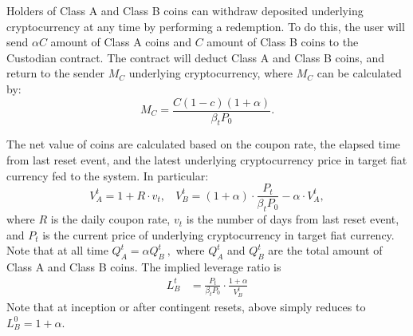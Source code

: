 \documentclass[draft, noinfoline]{ectaart}
\numberwithin{equation}{section}
\theoremstyle{plain}
\begin{document}
\begin{appendices}

Holders of Class A and Class B coins can withdraw deposited underlying cryptocurrency at any time by performing a redemption. To do this, the user will send $\alpha C$ amount of Class A coins and $C$ amount of Class B coins to the Custodian contract. The contract will deduct Class A and Class B coins, and return to the sender $M_{C}$ underlying cryptocurrency, where $M_{C}$ can be calculated by:
\begin{equation}
M_{C}=\frac{C \left(1-c\right) \left(1+\alpha\right)}{\beta_t P_{0}}.
\label{eq:redemption-1}
\end{equation}


The net value of coins are calculated based on the coupon rate, the elapsed time from last reset event, and the latest underlying cryptocurrency price in target fiat currency fed to the system. In particular:
\begin{equation}
V_{A}^{t}=  1+R\cdot v_t,~~~~
V_{B}^{t}=  \left(1+\alpha\right)\cdot\frac{P_{t}}{\beta_tP_{0}}-\alpha\cdot V_{A}^{t} ,
\label{eq:netvalue-1}
\end{equation}
where $R$ is the daily coupon rate, $v_t$ is the number of days from last reset event, and $P_{t}$ is the current price of underlying cryptocurrency in target fiat currency.
Note that at all time
$
Q_{A}^{t}=\alpha Q_{B}^{t}\ ,
$
where $Q_{A}^{t}$ and $Q_{B}^{t}$ are the total amount of Class A and Class B coins.
The implied leverage ratio is
\begin{align*}
L_{B}^{t} & =\frac{P_{t}}{\beta_tP_{0}}\cdot\frac{1+\alpha}{V_{B}^{t}}
\end{align*}
Note that at inception or after contingent resets, above simply reduces to $L_{B}^{0}=1+\alpha$.


\end{appendices}
\end{document}
